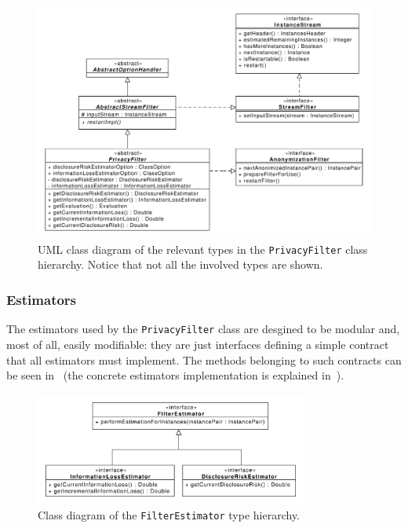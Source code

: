 \begin{figure}[h]
	\centering
	\includegraphics[width=1.0\textwidth]{figures/class_PrivacyFilter.pdf}
	\caption{UML class diagram of the relevant types in the \texttt{PrivacyFilter} class hierarchy. Notice that not all the involved types are shown.}
	\label{fig:privacy-filter-uml}
\end{figure}

\subsubsection*{Estimators}
\label{Implementation:PrivacyFilter:PrivacyFilter:Estimators}

The estimators used by the \texttt{PrivacyFilter} class are desgined to be modular and, most of all, easily modifiable: they are just interfaces defining a simple contract that all estimators must implement. The methods belonging to such contracts can be seen in~ (the concrete estimators implementation is explained in~).

\begin{figure}[h]
	\centering
	\includegraphics[width=0.8\textwidth]{figures/class_Estimators.pdf}
	\caption{Class diagram of the \texttt{FilterEstimator} type hierarchy.}
	\label{fig:estimators-uml}
\end{figure}

